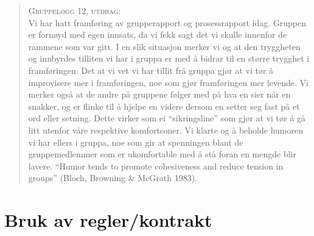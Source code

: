 \begin{quote}
  \hspace{20pt} \textsc{Gruppelogg 12, utdrag:}\\
  
Vi har hatt framføring av grupperapport og prosessrapport idag. Gruppen er fornøyd med egen innsats, da 
vi fekk sagt det vi skulle innenfor de rammene som var gitt. I en slik situasjon merker vi og at den 
tryggheten og innbyrdes tilliten vi har i gruppa er med å bidrar til en større trygghet i framføringen. 
Det at vi vet vi har tillit frå gruppa gjør at vi tør å improvisere mer i framføringen, noe som gjør 
framføringen mer levende. Vi merker også at de andre på gruppene følger med på hva en sier når en snakker, 
og er flinke til å hjelpe en videre dersom en setter seg fast på et ord eller setning. Dette virker som 
ei ``sikringsline'' som gjør at vi tør å gå litt utenfor våre respektive komfortsoner. Vi klarte og å beholde 
humoren vi har ellers i gruppa, noe som gir at spenningen blant de gruppemedlemmer som er ukomfortable 
med å stå foran en mengde blir lavere. ``Humor tends to promote cohesiveness and reduce tension in groups'' 
(Bloch, Browning \& McGrath 1983).
\end{quote}



\section{Bruk av regler/kontrakt}

